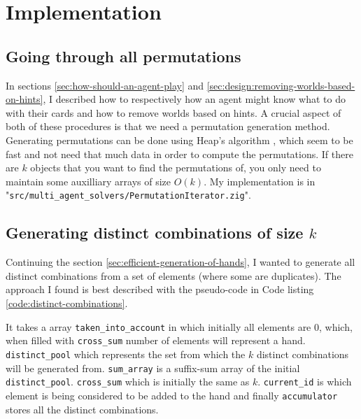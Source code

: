\section{Implementation}


\subsection{Going through all permutations}
In sections \ref{sec:how-should-an-agent-play} and \ref{sec:design:removing-worlds-based-on-hints}, I described how to respectively how an agent might know what to do with their cards and how to remove worlds based on hints. A crucial aspect of both of these procedures is that we need a permutation generation method.
Generating permutations can be done using Heap's algorithm \cite{wiki:heapsalgorithm}, which seem to be fast and not need that much data in order to compute the permutations. If there are $k$ objects that you want to find the permutations of, you only need to maintain some auxilliary arrays of size $O(k)$. My implementation is in "{\tt src/multi\_agent\_solvers/PermutationIterator.zig}". 


\subsection{Generating distinct combinations of size $k$} \label{implementation:sec:generating-distinct-combinations}
Continuing the section \ref{sec:efficient-generation-of-hands}, I wanted to generate all distinct combinations from a set of elements (where some are duplicates). The approach I found is best described with the pseudo-code in Code listing \ref{code:distinct-combinations}. 

It takes a array {\tt  taken\_into\_account} in which initially all elements are 0, which, when filled with {\tt cross\_sum} number of elements will represent a hand. {\tt distinct\_pool} which represents the set from which the $k$ distinct combinations will be generated from. {\tt sum\_array} is a suffix-sum array of the initial {\tt distinct\_pool}. {\tt cross\_sum} which is initially the same as $k$. {\tt current\_id} is which element is being considered to be added to the hand and finally {\tt accumulator} stores all the distinct combinations.

